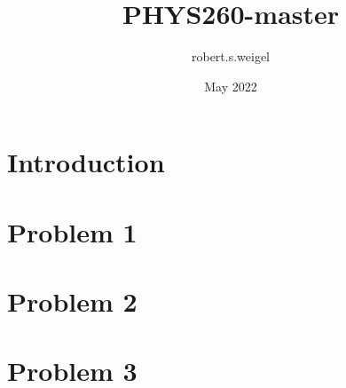\documentclass{article}
\title{PHYS260-master}
\author{robert.s.weigel }
\date{May 2022}
\begin{document}
\maketitle

\section{Introduction}
\section{Problem 1}
\section{Problem 2}
\section{Problem 3}
\end{document}
